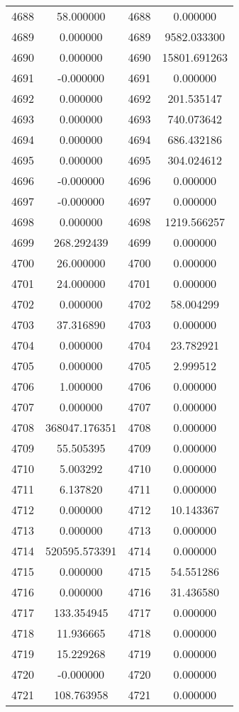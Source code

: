 \documentclass[12pt]{article}
\begin{document}
\begin{longtable}{@{}cccc@{}}
4688 & 58.000000 & 4688 & 0.000000 \\
4689 & 0.000000 & 4689 & 9582.033300 \\
4690 & 0.000000 & 4690 & 15801.691263 \\
4691 & -0.000000 & 4691 & 0.000000 \\
4692 & 0.000000 & 4692 & 201.535147 \\
4693 & 0.000000 & 4693 & 740.073642 \\
4694 & 0.000000 & 4694 & 686.432186 \\
4695 & 0.000000 & 4695 & 304.024612 \\
4696 & -0.000000 & 4696 & 0.000000 \\
4697 & -0.000000 & 4697 & 0.000000 \\
4698 & 0.000000 & 4698 & 1219.566257 \\
4699 & 268.292439 & 4699 & 0.000000 \\
4700 & 26.000000 & 4700 & 0.000000 \\
4701 & 24.000000 & 4701 & 0.000000 \\
4702 & 0.000000 & 4702 & 58.004299 \\
4703 & 37.316890 & 4703 & 0.000000 \\
4704 & 0.000000 & 4704 & 23.782921 \\
4705 & 0.000000 & 4705 & 2.999512 \\
4706 & 1.000000 & 4706 & 0.000000 \\
4707 & 0.000000 & 4707 & 0.000000 \\
4708 & 368047.176351 & 4708 & 0.000000 \\
4709 & 55.505395 & 4709 & 0.000000 \\
4710 & 5.003292 & 4710 & 0.000000 \\
4711 & 6.137820 & 4711 & 0.000000 \\
4712 & 0.000000 & 4712 & 10.143367 \\
4713 & 0.000000 & 4713 & 0.000000 \\
4714 & 520595.573391 & 4714 & 0.000000 \\
4715 & 0.000000 & 4715 & 54.551286 \\
4716 & 0.000000 & 4716 & 31.436580 \\
4717 & 133.354945 & 4717 & 0.000000 \\
4718 & 11.936665 & 4718 & 0.000000 \\
4719 & 15.229268 & 4719 & 0.000000 \\
4720 & -0.000000 & 4720 & 0.000000 \\
4721 & 108.763958 & 4721 & 0.000000 \\

\end{longtable}
\end{document}
